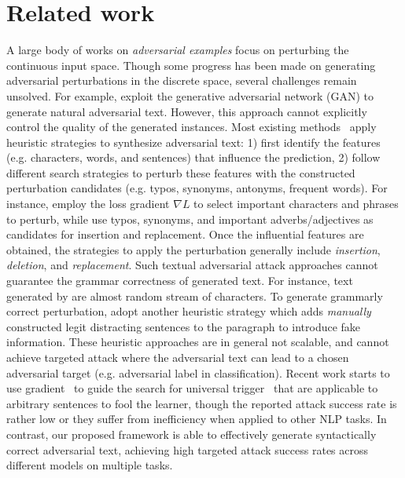 \section{Related work}
A large body of works on \emph{adversarial examples} focus on perturbing the continuous input space. Though some progress has been made on generating adversarial perturbations in the discrete space, several challenges  remain unsolved. For example, 
\cite{zhao2017-generating} exploit the generative adversarial network (GAN) to generate natural adversarial text. However, this approach cannot explicitly control the quality of the generated instances. 
Most existing methods~\citep{ren-etal-2019-generating,zhang-etal-2019-generating-fluent,jia-liang-2017-adversarial,li2018textbugger,TextFooler} apply heuristic strategies to synthesize adversarial text: 1) first identify the features (e.g. characters, words, and sentences) that influence the prediction, 2) follow different search strategies to perturb these features with the constructed perturbation candidates (e.g. typos, synonyms, antonyms, frequent
words).  For instance, \cite{liang2017-deep} employ the loss gradient \(\nabla L\) to select important characters and phrases to perturb, while \cite{samanta2017-towards} use typos,
synonyms, and important adverbs/adjectives as candidates for
insertion and replacement. Once the influential features are obtained, the strategies to apply
the perturbation generally include \emph{insertion}, \emph{deletion}, and \emph{replacement}.
Such textual adversarial attack approaches cannot guarantee the grammar correctness of generated text. For instance, text generated by \cite{liang2017-deep} are almost random stream of
characters. To generate grammarly correct perturbation, \citeauthor{jia-liang-2017-adversarial} adopt another heuristic strategy which adds \emph{manually} constructed legit distracting sentences to the paragraph to introduce fake information. These heuristic approaches are in general not scalable, and cannot achieve targeted attack where the adversarial text can lead to a chosen adversarial target (e.g. adversarial label in classification). Recent work starts to use gradient~\citep{Michel2019OnEO,Ebrahimi2017HotFlipWA} to guide the search for universal trigger~\citep{wallace-etal-2019-universal} that are applicable to arbitrary sentences to fool the learner, though the reported attack success rate is rather low or they suffer from inefficiency when applied to other NLP tasks. 
In contrast, our proposed \advcodec framework is able to effectively generate syntactically correct adversarial text, achieving high targeted attack success rates across different models on multiple tasks.
